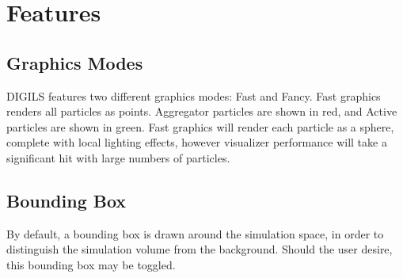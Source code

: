 \documentclass[fleqn,10pt]{UserGuideArx} %
\begin{document}
\flushbottom %

\maketitle %

\tableofcontents %

\thispagestyle{empty} %





\section{Features}

\subsection{Graphics Modes}
DIGILS features two different graphics modes: Fast and Fancy. Fast graphics renders all particles as points. Aggregator particles are shown in red, and Active particles are shown in green. Fast graphics will render each particle as a sphere, complete with local lighting effects, however visualizer performance will take a significant hit with large numbers of particles.
\subsection{Bounding Box}
By default, a bounding box is drawn around the simulation space, in order to distinguish the simulation volume from the background. Should the user desire, this bounding box may be toggled.
\end{document}
